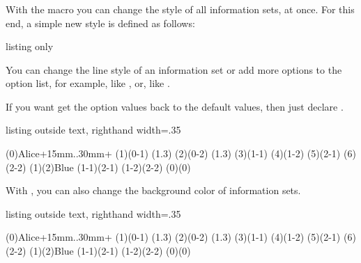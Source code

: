 \subsubsection{\protect\cmd{\setxtinfosetstyle}}
\label{ssec:setxtinfosetstyle}

With the macro \icmd{\setxtinfosetstyle} you can change the style of all information sets, at once.
For this end, a simple new style  is defined as follows:
\begin{tcblisting}{listing only}
\NewDocumentCommand {}
{  }
\end{tcblisting}

You can change the line style of an information set or add more options to the option list, for example, like , or, like .

If you want get the option values back to the default values, then just declare \cmd{\setxtinfosetstyle}.

\begin{tcblisting}{listing outside text, righthand width=.35\linewidth}
\begin{istgame}
\istroot(0){Alice}+15mm..30mm+
  \istb \istb \endist
\istroot(1)(0-1)  \istbA(1.3) \istb \endist
\istroot(2)(0-2)  \istbA(1.3) \istb \endist
\xtdistance{10mm}{8mm}
\istroot(3)(1-1)  \istb \istb \endist
\istroot(4)(1-2)  \istb \istb \endist
\istroot(5)(2-1)  \istb \istb \endist
\istroot(6)(2-2)  \istb \istb \endist
{}
\xtInfoset(1)(2){Blue}
\xtInfoset(1-1)(2-1)
\xtInfosetO(1-2)(2-2)
\setxtinfosetstyle %
\xtInfosetO(0)(0)
\end{istgame}
\end{tcblisting}

With \cmd{\setxtinfosetstyle}, you can also change the background color of information sets.
\begin{tcblisting}{listing outside text, righthand width=.35\linewidth}
\begin{istgame}
\istroot(0){Alice}+15mm..30mm+
  \istb \istb \endist
\istroot(1)(0-1)  \istbA(1.3) \istb \endist
\istroot(2)(0-2)  \istbA(1.3) \istb \endist
\xtdistance{10mm}{8mm}
\istroot(3)(1-1)  \istb \istb \endist
\istroot(4)(1-2)  \istb \istb \endist
\istroot(5)(2-1)  \istb \istb \endist
\istroot(6)(2-2)  \istb \istb \endist
{}
\xtInfosetO(1)(2){Blue}
\xtInfosetO(1-1)(2-1)
\xtInfoset(1-2)(2-2)
\setxtinfosetstyle %
\xtInfosetO(0)(0)
\end{istgame}
\end{tcblisting}


